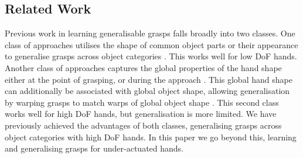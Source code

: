 \subsection{Related Work}
Previous work in learning generalisable grasps falls broadly into two classes. One class of approaches utilises the shape of common object parts or their appearance to generalise grasps across object categories \cite{saxena2008b,detry2013a,herzog2014a, kroemer2012a}. This works well for low DoF hands. Another class of approaches captures the global properties of the hand shape either at the point of grasping, or during the approach \cite{ben2012generalization}. This global hand shape can additionally be associated with global object shape, allowing generalisation by warping grasps to match warps of global object shape \cite{hillenbrand2012transferring}. This second class works well for high DoF hands, but generalisation is more limited. We have previously achieved the advantages of both classes, generalising grasps across object categories with high DoF hands. In this paper we go beyond this, learning and generalising grasps for under-actuated hands. 